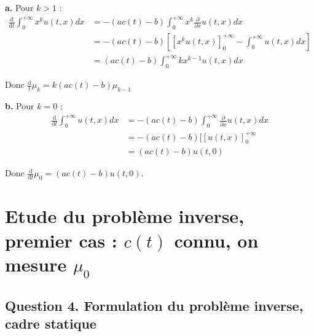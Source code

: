 \documentclass[a4paper]{article}
\begin{document}
\textbf{a.}
Pour $k>1$ :
\[	
\begin{split}
	\displaystyle \frac{\mathrm{d}}{\mathrm{d} t} \int_0^{+\infty} x^k u(t,x)dx
	                        &= - (ac(t)-b)\int_0^{+\infty}
							x^k \frac{\partial}{\partial x}u(t,x)dx\\
							&= - (ac(t)-b) [
							[x^k u(t,x)]_0^{+\infty} 
							- \int_0^{+\infty} u(t,x)dx ]\\
							& = (ac(t)-b) \int_0^{+\infty} kx^{k-1} u(t,x)dx
\end{split}
\]

Donc $ \displaystyle \frac{\mathrm{d}}{\mathrm t}\mu_k = k (ac(t)-b) \mu_{k-1}$


\textbf{b.}
Pour $k =0$ :
\[
\begin{split}
	\displaystyle \frac{\mathrm{d}}{\mathrm{d} t} \int_0^{+\infty} u(t,x)dx
	                        &= - (ac(t)-b)\int_0^{+\infty}\frac{\partial}{\partial x}u(t,x)dx\\
							&= - (ac(t)-b) [
							[u(t,x)]_0^{+\infty} \\
							&= 	(ac(t)-b)u(t,0)
\end{split}
\]

Donc $\displaystyle \frac{\mathrm{d}}{\mathrm{d} t} \mu_0 = (ac(t)-b)u(t,0)$.





\section{Etude du problème inverse, premier cas : $c(t)$ connu, on mesure $\mu_0$}




\subsection*{Question 4. Formulation du problème inverse, cadre statique}
\end{document}
